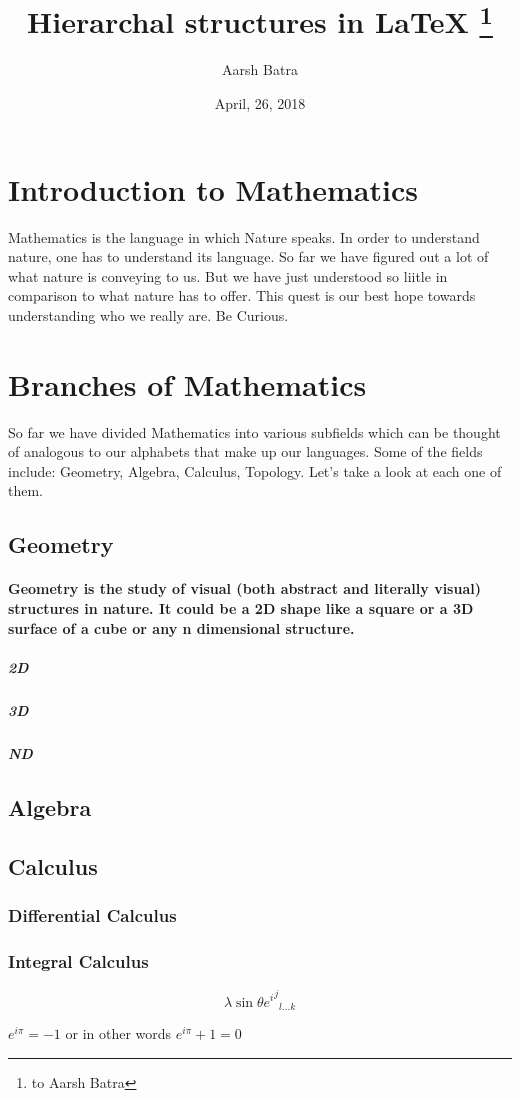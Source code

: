 \documentclass{article}
\title{Hierarchal structures in LaTeX \thanks{to Aarsh Batra}}
\author{Aarsh Batra}
\date{April, 26, 2018}
\begin{document}
\maketitle
\tableofcontents

\newpage
{}
\section{Introduction to Mathematics}
Mathematics is the language in which Nature speaks. In order to understand nature, one has to understand its language. So far we have figured out a lot of what nature is conveying to us. But we have just understood so liitle in comparison to what nature has to offer. This quest is our best hope towards understanding who we really are. Be Curious.

\section{Branches of Mathematics}
So far we have divided Mathematics into various subfields which can be thought of analogous to our alphabets that make up our languages. Some of the fields include: Geometry, Algebra, Calculus, Topology. Let's take a look at each one of them.

\subsection{Geometry}
\paragraph{Geometry is the study of visual (both abstract and literally visual) structures in nature. It could be a 2D shape like a square or a 3D surface of a cube or any n dimensional structure.}
\subparagraph{2D}
\subparagraph{3D}
\subparagraph{ND}

\subsection{Algebra}

\subsection{Calculus}

\subsubsection{Differential Calculus}

\subsubsection{Integral Calculus}

$$\lambda \sin{\theta} {{e^i}^j}_{l\dots k}$$

$ e^{i\pi} = -1 $ or in other words $e^{i\pi} + 1 = 0$
\end{document}
